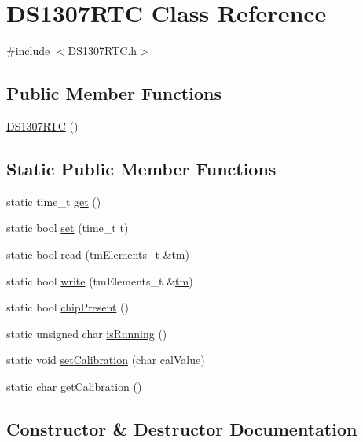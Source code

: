 \hypertarget{class_d_s1307_r_t_c}{}\section{D\+S1307\+R\+TC Class Reference}
\label{class_d_s1307_r_t_c}


{\ttfamily \#include $<$D\+S1307\+R\+T\+C.\+h$>$}

\subsection*{Public Member Functions}
\begin{DoxyCompactItemize}
\item 
\hyperlink{class_d_s1307_r_t_c_aecdeeb8640b360580ac69d767362d055}{D\+S1307\+R\+TC} ()
\end{DoxyCompactItemize}
\subsection*{Static Public Member Functions}
\begin{DoxyCompactItemize}
\item 
static time\+\_\+t \hyperlink{class_d_s1307_r_t_c_aa77f08d6b491d3a43daa3a7708bf15b7}{get} ()
\item 
static bool \hyperlink{class_d_s1307_r_t_c_a07bae612f0ece5205399e21f85dd2ef0}{set} (time\+\_\+t t)
\item 
static bool \hyperlink{class_d_s1307_r_t_c_a92a19c31652e3bb203d187e49ab68469}{read} (tm\+Elements\+\_\+t \&\hyperlink{_w_s_8ino_a52357cbf68af66972047f7aed7a45218}{tm})
\item 
static bool \hyperlink{class_d_s1307_r_t_c_a0746c0e854a43df1e2b25527f97cdf12}{write} (tm\+Elements\+\_\+t \&\hyperlink{_w_s_8ino_a52357cbf68af66972047f7aed7a45218}{tm})
\item 
static bool \hyperlink{class_d_s1307_r_t_c_a19ebd3541b23215192ab2c4697d55ef0}{chip\+Present} ()
\item 
static unsigned char \hyperlink{class_d_s1307_r_t_c_aa6e8002cae02d640cfeed73c1e274338}{is\+Running} ()
\item 
static void \hyperlink{class_d_s1307_r_t_c_a5ce93900a76f613fb23dcbeda146e072}{set\+Calibration} (char cal\+Value)
\item 
static char \hyperlink{class_d_s1307_r_t_c_a3f519d8587e008c81e64bcdfa9583895}{get\+Calibration} ()
\end{DoxyCompactItemize}


\subsection{Constructor \& Destructor Documentation}
\mbox{\label{class_d_s1307_r_t_c_aecdeeb8640b360580ac69d767362d055}} 
